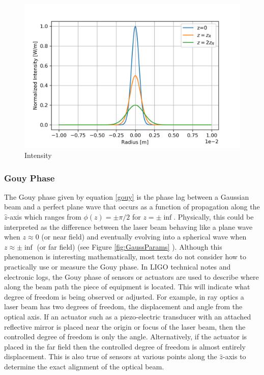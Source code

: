 		\begin{figure}[ht]
			\centering
			\includegraphics[width=0.65 \textwidth]{../Figures/GaussBeamIntensity.png}
			\caption{Intensity}
			\label{fig:GaussIntensity}
		\end{figure}

		\subsubsection{Gouy Phase}
		The Gouy phase given by equation \ref{gouy} is the phase lag between a Gaussian beam and a perfect plane wave that occurs as a function of propagation along the $\hat{z}$-axis which ranges from $\phi(z) = \pm \pi/2$ for $z =\pm \inf$.  Physically, this could be interpreted as the difference between the laser beam behaving like a plane wave when $z\approx0$ (or near field) and eventually evolving into a spherical wave when $z\approx \pm \inf$ (or far field) (see Figure \ref{fig:GaussParams} ).  Although this phenomenon is interesting mathematically, most texts do not consider how to practically use or measure the Gouy phase.  In LIGO technical notes and electronic logs, the Gouy phase of sensors or actuators are used to describe where along the beam path the piece of equipment is located.  This will indicate what degree of freedom is being observed or adjusted.  For example, in ray optics \cite{Saleh} a laser beam has two degrees of freedom, the displacement and angle from the optical axis.  If an actuator such as a piezo-electric transducer with an attached reflective mirror is placed near the origin or focus of the laser beam, then the controlled degree of freedom is only the angle.  Alternatively, if the actuator is placed in the far field then the controlled degree of freedom is almost entirely displacement.  This is also true of sensors at various points along the $\hat{z}$-axis to determine the exact alignment of the optical beam.
		
